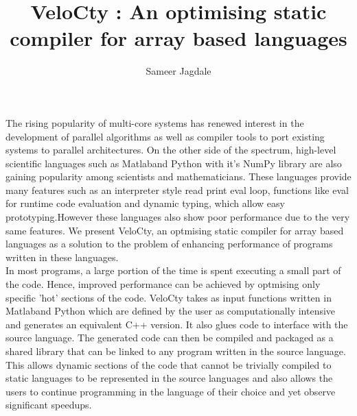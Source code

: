 \documentclass[a4paper, 12pt]{article}
\newcommand{\matlab}{{\textsc Matlab}\space}
\begin{document}
\title{VeloCty : An optimising static compiler for array based languages}
\author{Sameer Jagdale}
\maketitle
The rising popularity of multi-core systems has renewed interest in the development of parallel algorithms as well as compiler tools to port existing systems to parallel architectures. On the other side of the spectrum, high-level scientific languages such as \matlab and Python with it's NumPy library are also gaining popularity among scientists and mathematicians. These languages provide many features such as an interpreter style read print eval loop, functions like eval for runtime code evaluation and dynamic typing, which allow easy prototyping.However these languages also show poor performance due to the very same features. We present VeloCty, an optmising static compiler for array based languages as a solution to the problem of enhancing performance of programs written in these languages. \\ 
In most programs, a large portion of the time is spent executing a small part of the code. Hence, improved performance can be achieved by optmising only specific 'hot' sections of the code. VeloCty takes as input functions written in \matlab and Python which are defined by the user as computationally intensive and generates an equivalent C++ version. It also glues code to interface with the source language. The generated code can then be compiled and packaged as a shared library that can be linked to any program written in the source language. This allows dynamic sections of the code that cannot be trivially compiled to static languages to be represented in the source languages and also allows the users to continue programming in the language of their choice and yet observe significant speedups. 
\end{document}
